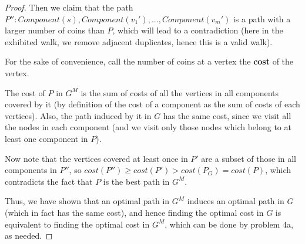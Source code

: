 \documentclass[answers]{exam}
\begin{document}
\begin{questions}
\begin{parts}
\begin{solution}
\begin{proof}
Then we claim that the path $P'': Component(s), Component(v_1'), ..., Component(v_m')$ is a path with a larger number of coins than $P$, which will lead to a contradiction (here in the exhibited walk, we remove adjacent duplicates, hence this is a valid walk).

For the sake of convenience, call the number of coins at a vertex the \textbf{cost} of the vertex.

The cost of $P$ in $G^M$ is the sum of costs of all the vertices in all components covered by it (by definition of the cost of a component as the sum of costs of each vertices). Also, the path induced by it in $G$ has the same cost, since we visit all the nodes in each component (and we visit only those nodes which belong to at least one component in $P$).

Now note that the vertices covered at least once in $P'$ are a subset of those in all components in $P''$, so $cost(P'') \ge cost(P') > cost(P_G) = cost(P)$, which contradicts the fact that $P$ is the best path in $G^M$.

Thus, we have shown that an optimal path in $G^M$ induces an optimal path in $G$ (which in fact has the same cost), and hence finding the optimal cost in $G$ is equivalent to finding the optimal cost in $G^M$, which can be done by problem 4a, as needed.
\end{proof}












\end{solution}
\end{parts}
\end{questions}
\end{document}
